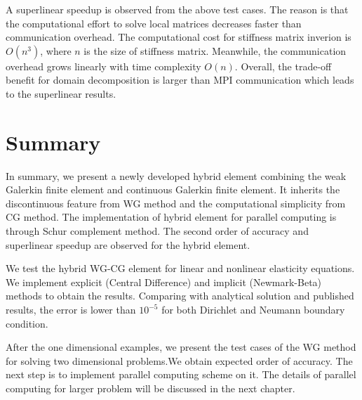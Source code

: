    A superlinear speedup is observed from the above test cases. The reason is that the computational effort to solve local matrices decreases faster than communication overhead. The computational cost for stiffness matrix inverion is $ O(n^{3}) $, where $ n $ is the size of stiffness matrix. Meanwhile, the communication overhead grows linearly with time complexity $ O(n) $.  Overall, the trade-off benefit for domain decomposition is larger than MPI communication which leads to the superlinear results. 
   
   
   		\section{Summary}
   		
   		In summary, we present a newly developed hybrid element combining the weak Galerkin finite element and continuous Galerkin finite element. It inherits the discontinuous feature from WG method and the computational simplicity from CG method. The implementation of hybrid element for parallel computing is through Schur complement method. The second order of accuracy and superlinear speedup are observed for the hybrid element. 
   		
   		We test the hybrid WG-CG element for linear and nonlinear elasticity equations. We implement explicit (Central Difference) and implicit (Newmark-Beta) methods to obtain the results. Comparing with analytical solution and published results, the error is lower than $ 10^{-5} $ for both Dirichlet and Neumann boundary condition.
   		
   		After the one dimensional examples, we present the test cases of the WG method for solving two dimensional problems.We obtain expected order of accuracy. The next step is to implement parallel computing scheme on it. The details of parallel computing for larger problem will be discussed in the next chapter.